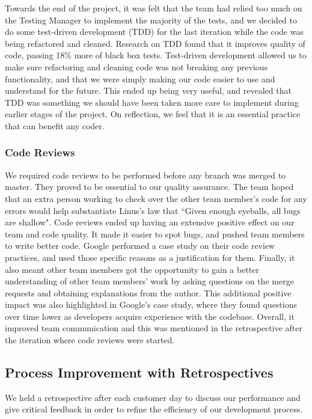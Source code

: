 \documentclass{l3proj}
\begin{document}
Towards the end of the project, it was felt that the team had relied too much on the Testing Manager to implement the majority of the tests, and we decided to do some test-driven development (TDD) for the last iteration while the code was being refactored and cleaned. Research on TDD found that it improves quality of code, passing 18\% more of black box tests\cite{tdd:George}. Test-driven development allowed us to make sure refactoring and cleaning code was not breaking any previous functionality, and that we were simply making our code easier to use and understand for the future. This ended up being very useful, and revealed that TDD was something we should have been taken more care to implement during earlier stages of the project. On reflection, we feel that it is an essential practice that can benefit any coder.


\subsubsection{Code Reviews}
We required code reviews to be performed before any branch was merged to master. They proved to be essential to our quality assurance. The team hoped that an extra person working to check over the other team member’s code for any errors would help substantiate Linus's law that ``Given enough eyeballs, all bugs are shallow"\cite{cathedral:Raymond}. Code reviews ended up having an extensive positive effect on our team and code quality. It made it easier to spot bugs, and pushed team members to write better code. Google performed a case study on their code review practices, and used those specific reasons as a justification for them\cite{codereview:Google}. Finally, it also meant other team members got the opportunity to gain a better understanding of other team members' work by asking questions on the merge requests and obtaining explanations from the author. This additional positive impact was also highlighted in Google's case study, where they found questions over time lower as developers acquire experience with the codebase\cite{codereview:Google}. Overall, it improved team communication and this was mentioned in the retrospective after the iteration where code reviews were started.

\subsection{Process Improvement with Retrospectives}

We held a retrospective after each customer day to discuss our performance and give critical feedback in order to refine the efficiency of our development process\cite{agilemanifesto}.
\end{document}

